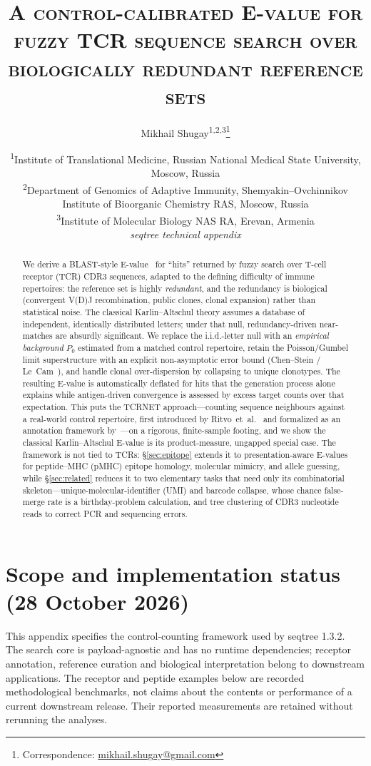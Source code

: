 \documentclass[11pt]{article}
\title{\scshape A control-calibrated E-value for fuzzy TCR sequence search over
biologically redundant reference sets}
\author{Mikhail Shugay\textsuperscript{1,2,3}\thanks{Correspondence:
  \href{mailto:mikhail.shugay@gmail.com}{mikhail.shugay@gmail.com}}}
\date{%
  \small
  \textsuperscript{1}Institute of Translational Medicine, Russian National Medical State University, Moscow, Russia\\
  \textsuperscript{2}Department of Genomics of Adaptive Immunity, Shemyakin--Ovchinnikov Institute of Bioorganic Chemistry RAS, Moscow, Russia\\
  \textsuperscript{3}Institute of Molecular Biology NAS RA, Erevan, Armenia\\[6pt]
  \normalsize\textit{seqtree technical appendix}%
}
\theoremstyle{oldplain}
\theoremstyle{oldrem}
\newcommand{\Pzero}{P_{0}}
\begin{document}
\maketitle

\begin{abstract}
We derive a BLAST-style E-value~\cite{Karlin1990,Altschul1990} for ``hits'' returned by fuzzy
search over T-cell receptor (TCR) CDR3 sequences, adapted to the defining difficulty of immune
repertoires: the reference set is highly \emph{redundant}, and the redundancy is biological
(convergent V(D)J recombination, public clones, clonal expansion) rather than statistical noise.
The classical Karlin--Altschul theory assumes a database of independent, identically distributed
letters; under that null, redundancy-driven near-matches are absurdly significant. We replace the
i.i.d.-letter null with an \emph{empirical background} $\Pzero$ estimated from a matched control
repertoire, retain the Poisson/Gumbel limit superstructure with an explicit non-asymptotic error
bound (Chen--Stein / Le~Cam~\cite{Arratia1990,LeCam1960}), and handle clonal over-dispersion by
collapsing to unique clonotypes. The resulting E-value is automatically deflated for hits that the
generation process alone explains while antigen-driven convergence is assessed by excess target counts over that expectation. This puts the TCRNET approach---counting
sequence neighbours against a real-world control repertoire, first introduced by
Ritvo~et~al.~\cite{Ritvo2018} and formalized as an annotation framework
by~\cite{Pogorelyy2019}---on a rigorous, finite-sample footing, and we show the classical
Karlin--Altschul E-value is its product-measure, ungapped special case. The framework is not tied to
TCRs: \S\ref{sec:epitope} extends it to presentation-aware E-values for peptide--MHC (pMHC) epitope
homology, molecular mimicry, and allele guessing, while \S\ref{sec:related} reduces it to two
elementary tasks that need only its combinatorial skeleton---unique-molecular-identifier (UMI) and
barcode collapse, whose chance false-merge rate is a birthday-problem calculation, and tree
clustering of CDR3 nucleotide reads to correct PCR and sequencing errors.
\end{abstract}

\section*{Scope and implementation status (28 October 2026)}
This appendix specifies the control-counting framework used by seqtree 1.3.2.
The search core is payload-agnostic and has no runtime dependencies; receptor annotation,
reference curation and biological interpretation belong to downstream applications.
The receptor and peptide examples below are recorded methodological benchmarks, not
claims about the contents or performance of a current downstream release.
Their reported measurements are retained without rerunning the analyses.
\end{document}
